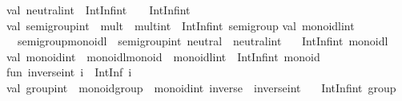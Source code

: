 \begin{isabellebody}
\begin{isamarkuptext}
\isanewline
val\ neutral{}int\ {}\ IntInf{}int\ {}\ {}{}\ {}\ IntInf{}int{}{}\isanewline
\isanewline
val\ semigroup{}int\ {}\ {}mult\ {}\ mult{}int{}\ {}\ IntInf{}int\ semigroup{}\isanewline
\isanewline
val\ monoidl{}int\ {}\isanewline
\ \ {}semigroup{}monoidl\ {}\ semigroup{}int{}\ neutral\ {}\ neutral{}int{}\ {}\isanewline
\ \ IntInf{}int\ monoidl{}\isanewline
\isanewline
val\ monoid{}int\ {}\ {}monoidl{}monoid\ {}\ monoidl{}int{}\ {}\ IntInf{}int\ monoid{}\isanewline
\isanewline
fun\ inverse{}int\ i\ {}\ IntInf{}{}\ i{}\isanewline
\isanewline
val\ group{}int\ {}\ {}monoid{}group\ {}\ monoid{}int{}\ inverse\ {}\ inverse{}int{}\ {}\isanewline
\ \ IntInf{}int\ group{}\isanewline

\end{isamarkuptext}
\end{isabellebody}
